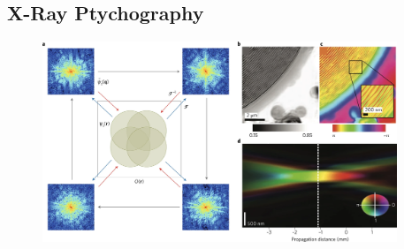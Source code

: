 \documentclass[12pt,aspectratio=169]{beamer} %
\begin{document}
\subsection{X-Ray Ptychography}

\begin{frame}
    \begin{figure}
    \end{figure}
\end{frame}

\begin{frame}
    \begin{figure}
        \includegraphics[height=6cm]{images/41566_2017_72_Fig2_HTML.png}
    \end{figure}
\end{frame}
\end{document}
